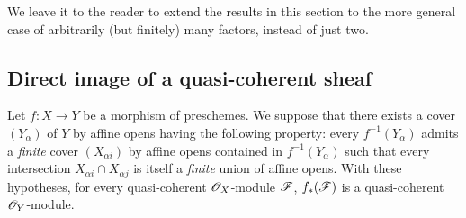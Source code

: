 We leave it to the reader to extend the results in this section to the more
general case of arbitrarily (but finitely) many factors, instead of just two.

\subsection{Direct image of a quasi-coherent sheaf}
\label{subsection-direct-image-of-qcoh}

\begin{prop}[9.2.1]
\label{prop-1.9.2.1}
Let $f:X\to Y$ be a morphism of
preschemes. We suppose that there exists a cover $(Y_\alpha)$ of $Y$ by affine
opens having the following property: every $f^{-1}(Y_\alpha)$ admits a
{\it finite} cover $(X_{\alpha i})$ by affine opens contained in
$f^{-1}(Y_\alpha)$ such that every intersection $X_{\alpha i}\cap X_{\alpha j}$
is itself a {\it finite} union of affine opens. With these hypotheses, for
every quasi-coherent $\mathscr{O}_X$-module $\mathscr{F}$, $f_*(\mathscr{F})$ is a
quasi-coherent $\mathscr{O}_Y$-module.
\end{prop}

